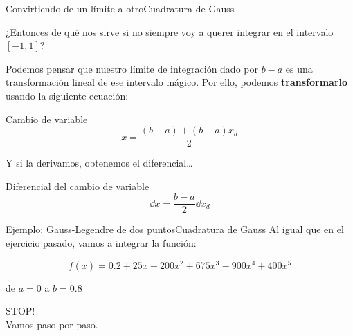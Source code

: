 \documentclass[spanish, c, dvipsnames]{beamer}
\begin{document}
\begin{frame}{Convirtiendo de un límite a otro}{Cuadratura de Gauss}

¿Entonces de qué nos sirve si no siempre voy a querer integrar en el intervalo $[-1, 1]$? \pause

\bigskip

Podemos pensar que nuestro límite de integración dado por $b - a$ es una \alert{transformación lineal} de ese intervalo mágico.
Por ello, podemos \textbf{transformarlo} usando la siguiente ecuación:
    
\begin{block}{Cambio de variable}
    \begin{equation}
        \label{eq:quadraturevarchange}
        x = \frac{(b + a) + (b - a)x_d}{2}
    \end{equation}
\end{block} \pause

Y si la derivamos, obtenemos el diferencial\dots

\begin{exampleblock}{Diferencial del cambio de variable}
    \begin{equation}
        \label{eq:quadraturevarchangedx}
        \dd{x} = \frac{b - a}{2}\dd{x_d}
    \end{equation}
\end{exampleblock}
\end{frame}

\begin{frame}[t]{Ejemplo: Gauss-Legendre de dos puntos}{Cuadratura de Gauss}
    Al igual que en el ejercicio pasado, vamos a integrar la función:
    
    \bigskip

    $$f(x) = 0.2 + 25x - 200 x^2 + 675 x^3 - 900 x^4 + 400x^5$$

    \bigskip

    de $a=0$ a $b = 0.8$ \pause

    \bigskip

    \begin{center}
        {\Huge
        STOP!}\\
        Vamos paso por paso.
    \end{center}
\end{frame}
\end{document}
